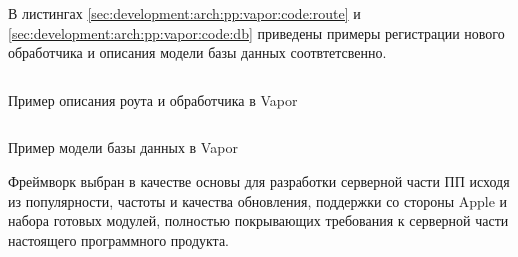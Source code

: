 В листингах \ref{sec:development:arch:pp:vapor:code:route} и \ref{sec:development:arch:pp:vapor:code:db} приведены примеры регистрации нового обработчика и описания модели базы данных соотвтетсвенно.

\begin{code}
	\inputminted{swift}{inc/src/vapor_route.swift}
   \caption{Пример описания роута и обработчика в Vapor}
   \label{sec:development:arch:pp:vapor:code:route}
\end{code}

\begin{code}
	\inputminted{swift}{inc/src/vapor_db.swift}
   \caption{Пример модели базы данных в Vapor}
   \label{sec:development:arch:pp:vapor:code:db}
\end{code}

Фреймворк выбран в качестве основы для разработки серверной части ПП исходя из популярности, частоты и качества обновления, поддержки со стороны Apple и набора готовых модулей, полностью покрывающих требования к серверной части настоящего программного продукта.